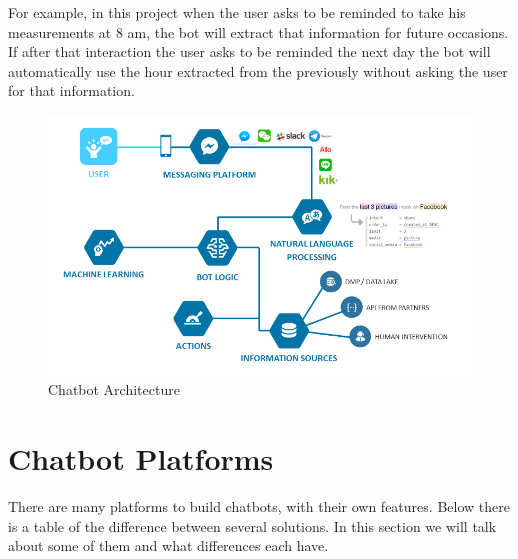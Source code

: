 For example, in this project when the user asks to be reminded to take his measurements at 8 am, the bot will extract that information for future occasions. If after that interaction the user asks to be reminded the next day the bot will automatically use the hour extracted from the previously without asking the user for that information.\\

\begin{center}
	\begin{figure}[h!]
		\centering
		\includegraphics[scale=0.6]{./images/3-cha-struct}
		\caption{Chatbot Architecture}
		\label{cha_struct}
	\end{figure}
\end{center}

\section{Chatbot Platforms}\label{sec:chap3_plat}

There are many platforms to build chatbots, with their own features. Below there is a table of the difference between several solutions. In this section we will talk about some of them and what differences each have.\\



